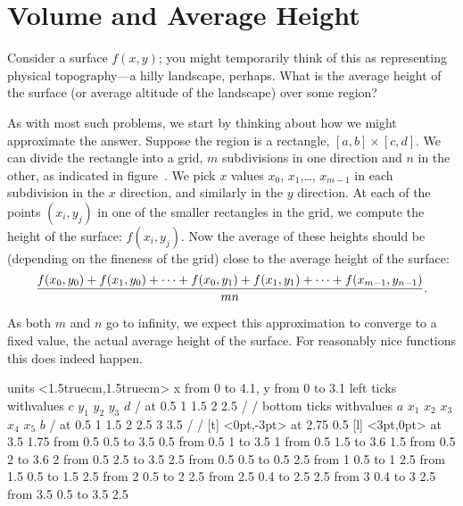 \section{Volume and Average Height}{}{}

Consider a surface $f(x,y)$; you might temporarily think of this as
representing physical topography---a hilly landscape, perhaps. What is
the average height of the surface (or average
altitude of the landscape) over some region?

As with most such problems, we start by thinking about how we
might approximate the answer. Suppose the region is a rectangle,
$[a,b]\times[c,d]$. We can divide the rectangle into a grid, $m$
subdivisions in one direction and $n$ in the other, as indicated in
figure~. We pick $x$ values $x_0$,
$x_1$,\dots, $x_{m-1}$ in each subdivision in the $x$ direction, and
similarly in the $y$ direction.
At each of the points $(x_i,y_j)$ in one of the smaller rectangles in
the grid, we
compute the height of the surface: $f(x_i,y_j)$. Now the average
of these heights should be (depending on the fineness of the grid)
close to the average height of the surface:
$${f(x_0,y_0)+f(x_1,y_0)+\cdots+f(x_0,y_1)+f(x_1,y_1)+\cdots+
f(x_{m-1},y_{n-1})\over mn}.$$

As both $m$ and $n$ go to infinity, we expect this approximation to
converge to a fixed value, the actual average height of the
surface. For reasonably nice functions this does indeed happen.

\figure
\vbox{\beginpicture
\normalgraphs
\ninepoint
\setcoordinatesystem units <1.5truecm,1.5truecm>
\setplotarea x from 0 to 4.1, y from 0 to 3.1
\axis left ticks withvalues $c$ $y_1$ $y_2$ $y_3$ $d$ / 
at 0.5 1 1.5 2 2.5 / /
\axis bottom ticks withvalues $a$ $x_1$ $x_2$ $x_3$ $x_4$ $x_5$ $b$ / 
at 0.5 1 1.5 2 2.5 3 3.5 / /
 [t] <0pt,-3pt> at 2.75 0.5
 [l] <3pt,0pt> at 3.5 1.75
\putrule from 0.5 0.5 to 3.5 0.5
\putrule from 0.5 1 to 3.5 1
\putrule from 0.5 1.5 to 3.6 1.5
\putrule from 0.5 2 to 3.6 2
\putrule from 0.5 2.5 to 3.5 2.5
\putrule from 0.5 0.5 to 0.5 2.5
\putrule from 1 0.5 to 1 2.5
\putrule from 1.5 0.5 to 1.5 2.5
\putrule from 2 0.5 to 2 2.5
\putrule from 2.5 0.4 to 2.5 2.5
\putrule from 3 0.4 to 3 2.5
\putrule from 3.5 0.5 to 3.5 2.5
\endpicture}

